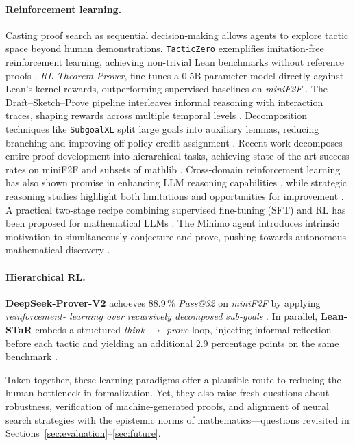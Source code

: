 \documentclass[acmsmall,anonymous]{acmart}
\begin{document}
\paragraph{Reinforcement learning.}  Casting proof search as sequential decision-making allows agents to explore tactic space beyond human demonstrations.  \texttt{TacticZero} exemplifies imitation-free reinforcement learning, achieving non-trivial Lean benchmarks without reference proofs \cite{wu2021tacticzero}. \emph{RL-Theorem Prover}, fine-tunes a 0.5B-parameter model directly against Lean’s kernel rewards, outperforming supervised baselines on \textit{miniF2F} \cite{luo2025rltheorem}. The Draft–Sketch–Prove pipeline interleaves informal reasoning with interaction traces, shaping rewards across multiple temporal levels \cite{jiang2022draft}.  Decomposition techniques like \texttt{SubgoalXL} split large goals into auxiliary lemmas, reducing branching and improving off-policy credit assignment \cite{yang2023subgoalxl}.  Recent work decomposes entire proof development into hierarchical tasks, achieving state-of-the-art success rates on miniF2F and subsets of mathlib \cite{williams2024decomposing}. Cross-domain reinforcement learning has also shown promise in enhancing LLM reasoning capabilities \cite{cheng2025revisitingrl,anonymous2025revisitingrl}, while strategic reasoning studies highlight both limitations and opportunities for improvement \cite{park2025canllmstrategic,anonymous2025canllmstrategic}. A practical two-stage recipe combining supervised fine-tuning (SFT) and RL has been proposed for mathematical LLMs \cite{yoshihara2025twostage}. The Minimo agent introduces intrinsic motivation to simultaneously conjecture and prove, pushing towards autonomous mathematical discovery \cite{poesia2024}.

\paragraph{Hierarchical RL.}
  \textbf{DeepSeek-Prover-V2} achoeves
  88.9\,\% \emph{Pass@32} on \textit{miniF2F} by applying \emph{reinforcement-
  learning over recursively decomposed sub-goals}
  \cite{Ren2025DeepSeekV2}.  In parallel,
  \textbf{Lean-STaR} embeds a structured \emph{think $\rightarrow$ prove}
  loop, injecting informal reflection before each tactic and
  yielding an additional 2.9 percentage points on the same benchmark
  \cite{Lin2025LeanSTaR}.

Taken together, these learning paradigms offer a plausible route to reducing the human bottleneck in formalization.  Yet, they also raise fresh questions about robustness, verification of machine-generated proofs, and alignment of neural search strategies with the epistemic norms of mathematics—questions revisited in Sections~\ref{sec:evaluation}–\ref{sec:future}.
\end{document}

